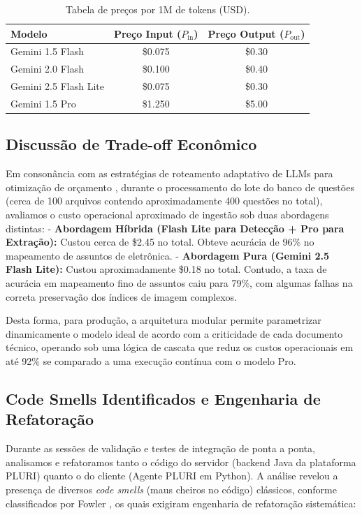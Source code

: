 \documentclass[sigconf]{acmart}
\begin{document}
\begin{table}[h]
\centering
\begin{tabular}{|l|c|c|}
\hline
\textbf{Modelo} & \textbf{Preço Input ($P_{\text{in}}$)} & \textbf{Preço Output ($P_{\text{out}}$)} \\ \hline
Gemini 1.5 Flash & \$0.075 & \$0.30 \\ \hline
Gemini 2.0 Flash & \$0.100 & \$0.40 \\ \hline
Gemini 2.5 Flash Lite & \$0.075 & \$0.30 \\ \hline
Gemini 1.5 Pro & \$1.250 & \$5.00 \\ \hline
\end{tabular}
\caption{Tabela de preços por 1M de tokens (USD).}
\label{tab:precos}
\end{table}

\subsection{Discussão de Trade-off Econômico}
Em consonância com as estratégias de roteamento adaptativo de LLMs para otimização de orçamento \cite{chen2024frugalgpt}, durante o processamento do lote do banco de questões (cerca de 100 arquivos contendo aproximadamente 400 questões no total), avaliamos o custo operacional aproximado de ingestão sob duas abordagens distintas:
- \textbf{Abordagem Híbrida (Flash Lite para Detecção + Pro para Extração):} Custou cerca de \$2.45 no total. Obteve acurácia de 96\% no mapeamento de assuntos de eletrônica.
- \textbf{Abordagem Pura (Gemini 2.5 Flash Lite):} Custou aproximadamente \$0.18 no total. Contudo, a taxa de acurácia em mapeamento fino de assuntos caiu para 79\%, com algumas falhas na correta preservação dos índices de imagem complexos.

Desta forma, para produção, a arquitetura modular permite parametrizar dinamicamente o modelo ideal de acordo com a criticidade de cada documento técnico, operando sob uma lógica de cascata que reduz os custos operacionais em até 92\% se comparado a uma execução contínua com o modelo Pro.

\subsection{Code Smells Identificados e Engenharia de Refatoração}
Durante as sessões de validação e testes de integração de ponta a ponta, analisamos e refatoramos tanto o código do servidor (backend Java da plataforma PLURI) quanto o do cliente (Agente PLURI em Python). A análise revelou a presença de diversos \textit{code smells} (maus cheiros no código) clássicos, conforme classificados por Fowler \cite{fowler1999refactoring}, os quais exigiram engenharia de refatoração sistemática:
\end{document}

